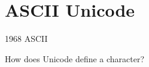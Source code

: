\documentclass[../index.tex]{subfiles}
\begin{document}
\renewcommand{\sectiontitle}{ASCII \textrightarrow{} Unicode}
\section{\sectiontitle}
%

\begin{frame}{1968 \textendash{} ASCII}
  \only{}
\end{frame}

\begin{frame}{How does Unicode define a character?}
  \only{}
\end{frame}


\end{document}
